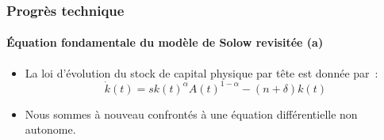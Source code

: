 \documentclass[10pt,notheorems]{beamer}
\theoremstyle{plain}
\theoremstyle{definition} %
\begin{document}
\begin{frame}
  \frametitle{Progrès technique}
  \framesubtitle{Équation fondamentale du modèle de Solow revisitée (a)}

  \bigskip

  \begin{itemize}

  \item La loi d'évolution du stock de capital physique par tête est donnée par~:
    \[
      \dot k(t) = s k(t)^{\alpha}A(t)^{1-\alpha} - (n+\delta)k(t)
    \]

    \bigskip

  \item Nous sommes à nouveau confrontés à une équation différentielle non autonome.\newline

  \end{itemize}


\end{frame}
\end{document}
